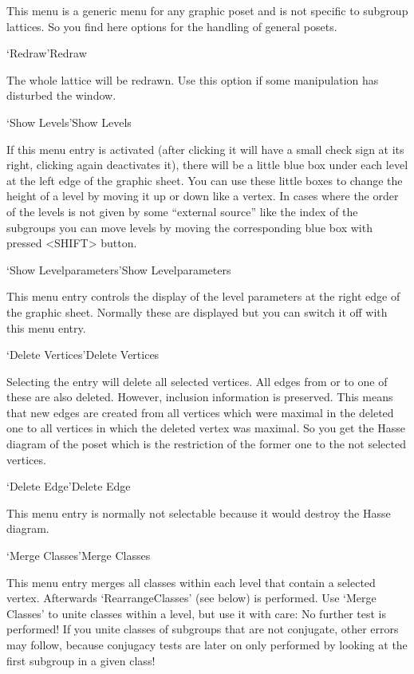 This menu is a generic menu for any graphic poset and is not specific to
subgroup lattices. So you find here options for the handling of general
posets. 

\>`Redraw'{Redraw}

  The whole lattice will be redrawn. Use this option if some manipulation
  has disturbed the window.
  
\>`Show Levels'{Show Levels}

  If this menu entry is activated (after clicking it will have a small
  check sign at its right, clicking again deactivates it), there will be a
  little blue box under each level at the left edge of the graphic
  sheet. You can use these little boxes to change the height of a level by
  moving it up or down like a vertex. In cases where the order of the
  levels is not given by some ``external source'' like the index of the
  subgroups you can move levels by moving the corresponding blue box with
  pressed <SHIFT> button.
  
\>`Show Levelparameters'{Show Levelparameters}

  This menu entry controls the display of the level parameters at the right 
  edge of the graphic sheet. Normally these are displayed but you can
  switch it off with this menu entry.

\>`Delete Vertices'{Delete Vertices}

  Selecting the entry will delete all selected vertices. All edges from or
  to one of these are also deleted. However, inclusion information is
  preserved. This means that new edges are created from all vertices which
  were maximal in the deleted one to all vertices in which the deleted
  vertex was maximal. So you get the Hasse diagram of the poset which is
  the restriction of the former one to the not selected vertices.

\>`Delete Edge'{Delete Edge}

  This menu entry is normally not selectable because it would destroy the
  Hasse diagram.
  
\>`Merge Classes'{Merge Classes}

This menu  entry merges all  classes within each  level that contain a
selected  vertex.    Afterwards  `RearrangeClasses'  (see   below)  is
performed.  Use `Merge Classes' to  unite classes within a level,  but
use it  with care: No further test  is performed! If you unite classes
of subgroups that are not conjugate, other  errors may follow, because
conjugacy tests  are later on only  performed by  looking at the first
subgroup in a given class!

